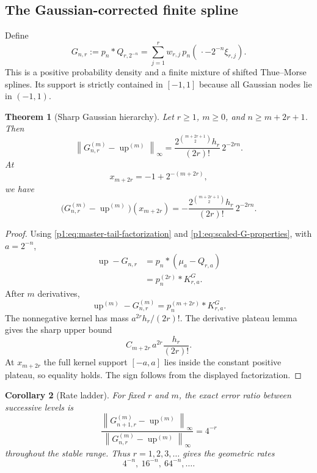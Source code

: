 \documentclass[11pt]{article}
\numberwithin{equation}{section}
\newtheorem{theorem}{Theorem}[section]
\newtheorem{corollary}[theorem]{Corollary}
\theoremstyle{definition}
\theoremstyle{remark}
\newcommand{\Up}{\operatorname{up}}
\newcommand{\norm}[1]{\left\lVert#1\right\rVert}
\begin{document}
\subsection{The Gaussian-corrected finite spline}

Define
\begin{equation}
 G_{n,r}:=p_n*Q_{r,2^{-n}}
 =\sum_{j=1}^{r}w_{r,j}\,p_n(\,\cdot-2^{-n}\xi_{r,j}).
 \label{p1:eq:Gnr}
\end{equation}
This is a positive probability density and a finite mixture of shifted Thue--Morse splines.  Its support is strictly contained in $[-1,1]$ because all Gaussian nodes lie in $(-1,1)$.

\begin{theorem}[Sharp Gaussian hierarchy]
\label{p1:thm:gaussian-exact}
Let $r\ge1$, $m\ge0$, and $n\ge m+2r+1$.  Then
\begin{equation}
 \boxed{
 \norm{G_{n,r}^{(m)}-\Up^{(m)}}_\infty
 =\frac{2^{\binom{m+2r+1}{2}}h_r}{(2r)!}\,2^{-2rn}.}
 \label{p1:eq:Gaussian-exact}
\end{equation}
At
\begin{equation}
 x_{m+2r}=-1+2^{-(m+2r)},
 \label{p1:eq:G-extremal}
\end{equation}
we have
\begin{equation}
 \boxed{
 \bigl(G_{n,r}^{(m)}-\Up^{(m)}\bigr)(x_{m+2r})
 =-\frac{2^{\binom{m+2r+1}{2}}h_r}{(2r)!}\,2^{-2rn}.}
 \label{p1:eq:G-signed}
\end{equation}
\end{theorem}

\begin{proof}
Using \eqref{p1:eq:master-tail-factorization} and \eqref{p1:eq:scaled-G-properties}, with $a=2^{-n}$,
\begin{align}
 \Up-G_{n,r}
 &=p_n*(\mu_a-Q_{r,a})\nonumber\\
 &=p_n^{(2r)}*K_{r,a}^G.
 \label{p1:eq:G-factorization}
\end{align}
After $m$ derivatives,
\[
 \Up^{(m)}-G_{n,r}^{(m)}
 =p_n^{(m+2r)}*K_{r,a}^G.
\]
The nonnegative kernel has mass $a^{2r}h_r/(2r)!$.  The derivative plateau lemma gives the sharp upper bound
\[
 C_{m+2r}\,a^{2r}\frac{h_r}{(2r)!}.
\]
At $x_{m+2r}$ the full kernel support $[-a,a]$ lies inside the constant positive plateau, so equality holds.  The sign follows from the displayed factorization.
\end{proof}

\begin{corollary}[Rate ladder]
For fixed $r$ and $m$, the exact error ratio between successive levels is
\begin{equation}
 \frac{\norm{G_{n+1,r}^{(m)}-\Up^{(m)}}_\infty}
 {\norm{G_{n,r}^{(m)}-\Up^{(m)}}_\infty}=4^{-r}
 \label{p1:eq:Gaussian-ratio}
\end{equation}
throughout the stable range.  Thus $r=1,2,3,\ldots$ gives the geometric rates
\[
 4^{-n},\ 16^{-n},\ 64^{-n},\ldots.
\]
\end{corollary}
\end{document}
